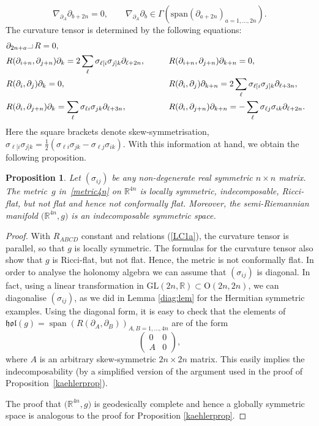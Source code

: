 \documentclass[pdftex]{sigma}
\numberwithin{equation}{section}
\newtheorem{Proposition}[Theorem]{Proposition}
 { \theoremstyle{definition}
\newtheorem{Definition}[Theorem]{Definition}
\newtheorem{Note}[Theorem]{Note}
\newtheorem{Example}[Theorem]{Example}
\newtheorem{Remark}[Theorem]{Remark} }
\newcommand{\GL}{\mathrm{GL}}
\newcommand{\1}{\mathbf{1}}
\newcommand{\rr}{\mathbb{R}}
\newcommand{\hol}{\mathfrak{hol}}
\newcommand{\+}{\oplus}
\newcommand{\del}{\partial}
\renewcommand{\=}{\equiv}
\DeclareMathOperator{\Span}{\mathrm{span}}
\newcommand{\hook}{\makebox[7pt]{\rule{6pt}{.3pt}\rule{.3pt}{5pt}}\,}
\newcommand{\R}{\mathbb{R}}
\begin{document}
\begin{equation}
\label{LC1a}
\nabla_{\partial_A}\partial_{b+2n}=0,\qquad
\nabla_{\partial_A}\partial_b \in \Gamma (\mathrm{span} (\partial_{a+2n})_{a=1,\ldots, 2n}).\end{equation}
The curvature tensor is determined by the following equations:
\begin{alignat*}{3}
&\del_{2n+a}\hook R = 0,&& &
\\
&R(\del_{i+n},\del_{j+n})\del_{k} =
2\sum_{\ell}\sigma_{\ell [i}\sigma_{j]k}\del_{\ell+2n},
\qquad&& R(\del_{i+n},\del_{j+n})\del_{k+n} = 0,&
\\
&R(\del_{i},\del_{j})\del_{k} = 0,\qquad&& R(\del_{i},\del_{j})\del_{k+n} = 2\sum_{\ell}\sigma_{\ell [i}\sigma_{j]k}\del_{\ell+3n},&
\\
&R(\del_{i},\del_{j+n})\del_{k} = \sum_{\ell}\sigma_{\ell i}\sigma_{jk}\del_{\ell+3n},\qquad&& R(\del_{i},\del_{j+n})\del_{k+n} = -\sum_{\ell}\sigma_{\ell j}\sigma_{ik}\del_{\ell+2n}.&
\end{alignat*}
Here the square brackets denote skew-symmetrisation, $\sigma_{\ell [i}\sigma_{j]k}=\tfrac{1}{2} \left(\sigma_{\ell i}\sigma_{jk} - \sigma_{\ell j}\sigma_{ik}\right)$.
With this information at hand, we obtain the following proposition.
\begin{Proposition}\label{realex:prop}
Let $(\sigma_{ij})$ be any non-degenerate real symmetric $n\times n$ matrix. The metric~$g$ in~\eqref{metric4n} on $\rr^{4n}$ is locally symmetric, indecomposable, Ricci-flat, but not flat and hence not conformally flat. Moreover, the semi-Riemannian manifold $\bigl(\R^{4n},g\bigr)$ is an indecomposable symmetric space.
\end{Proposition}
\begin{proof}
With $R_{ABCD}$ constant and relations (\ref{LC1a}), the curvature tensor is parallel, so that $g$ is locally symmetric. The formulas for the curvature tensor also show that $g$ is Ricci-flat, but not flat. Hence, the metric is not conformally flat. In order to
analyse the holonomy algebra we can assume that $(\sigma_{ij})$ is diagonal. In fact, using a linear transformation
in $\GL(2n,\R) \subset \mathrm{O}(2n,2n)$, we can diagonalise $(\sigma_{ij})$, as we did in Lemma \ref{diag:lem} for the
Hermitian symmetric examples. Using the diagonal form, it is easy to check that the elements of $\hol(g)=\Span (R(\del_A,\del_B))_{{A,B=1,\ldots ,4n}}$ are of the form
\[\begin{pmatrix} 0&0 \\ A&0\end{pmatrix},\]
where $A$ is an arbitrary skew-symmetric $2n\times 2n$ matrix. This easily implies the indecomposability (by a simplified version of the argument used in the proof of Proposition~\ref{kaehlerprop}).

The proof that
 $\bigl(\R^{4n},g\bigr)$ is geodesically complete and hence a globally symmetric space is analogous to the proof for Proposition \ref{kaehlerprop}.
\end{proof}
\end{document}

